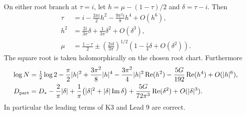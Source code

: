 \begin{proposition}\label{ari:C.3.1}
On either root branch at $\tau=i$, let
$h=\mu-(1-\tau)/2$ and $\delta=\tau-i$. Then
\begin{align*}
 \tau&=i-\frac{3\pi i}{2}h^2-\frac{9\pi^2i}{8}h^4+O(h^6),\\
 h^2&=\frac{2i}{3\pi}\delta+\frac1{3\pi}\delta^2+O(\delta^3),\\
 \mu&=\frac{1-\tau}{2}
  \mathbin{\pm}\left(\frac{2i\delta}{3\pi}\right)^{1/2}
          \left(1-\frac{i}{4}\delta+O(\delta^2)\right).
\end{align*}
The square root is taken holomorphically on the chosen root chart.
Furthermore
\begin{align}\label{ari:eq:cs-Li}
 \log N={}&\tfrac12\log2-\frac\pi2|h|^2
   +\frac{3\pi^2}{8}|h|^4
   -\frac{3\pi^2}{4}|h|^2\operatorname{Re}(h^2)
   -\frac{5G}{192}\operatorname{Re}(h^4)+O(|h|^6),\\
 D_{\rm part}={}&D_* -\frac2\pi|\delta|
  +\frac1\pi\bigl(|\delta|^2+|\delta|\operatorname{Im}\delta\bigr)
  +\frac{5G}{72\pi^3}\operatorname{Re}(\delta^2)
  +O(|\delta|^3).\nonumber
\end{align}
In particular the leading terms of K3 and Lead 9 are correct.
\end{proposition}
